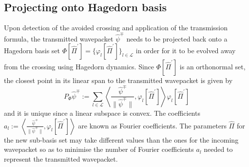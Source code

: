 \renewcommand{\baselinestretch}{1.5}
\usepackage{comment}
\usepackage[
backend=biber,
style=alphabetic,
sorting=ynt
]{biblatex}




%
%
%
%
%
%
%
%
%
%
%
%
\subsection{Projecting onto Hagedorn basis}
Upon detection of the avoided crossing and application of the transmission 
formula, the transmitted wavepacket $\hat{\psi}^{\mp}$ needs to be projected 
back onto a Hagedorn basis set $\Phi[\hat{\Pi}^\prime] =
\{\varphi_l[\hat{\Pi}^\prime]\}_{l \in \mathcal{L}}$ 
in order for it to be evolved away from the crossing using Hagedorn dynamics.  
Since $\Phi[\hat{\Pi}^\prime]$ is an orthonormal set,
the closest point in its linear span to the transmitted 
wavepacket is given by 
\begin{equation}
  P_{\Phi}\hat{\psi}^\mp := 
  \sum_{l \in \mathcal{L}} \left \langle \frac{\hat{\psi}^\mp}{\|\hat{\psi}^\mp \|} ,
  \varphi_l[\hat{\Pi}^\prime]  
  \right \rangle \varphi_l[\hat{\Pi}^\prime]
\end{equation}
and it is unique since a linear subspace is convex.
The coefficients 
$a_l := \left \langle \frac{\hat{\psi}^\mp}{\|\hat{\psi}^\mp \|} ,
\varphi_l[\hat{\Pi}^\prime] \right \rangle $
are known as Fourier coefficients.
The parameters $\hat{\Pi}$ for the new sub-basis set may take different 
values than the ones for the incoming wavepacket so as to minimise 
the number of Fourier coefficients $a_l$ needed to represent the 
transmitted wavepacket.
%
%
%
%

